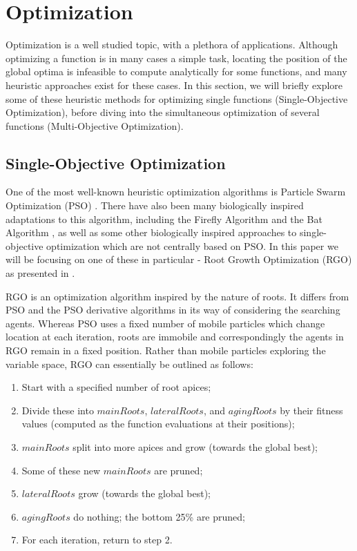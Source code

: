 \documentclass[letterpaper, 10 pt, conference]{ieeeconf}  %
\begin{document}
\section{Optimization}

Optimization is a well studied topic, with a plethora of applications.  Although optimizing a function is in many cases a simple task, locating the position of the global optima is infeasible to compute analytically for some functions, and many heuristic approaches exist for these cases.  In this section, we will briefly explore some of these heuristic methods for optimizing single functions (Single-Objective Optimization), before diving into the simultaneous optimization of several functions (Multi-Objective Optimization).

\subsection{Single-Objective Optimization}
One of the most well-known heuristic optimization algorithms is Particle Swarm Optimization (PSO) \cite{PSOPaper}.  There have also been many biologically inspired adaptations to this algorithm, including the Firefly Algorithm \cite{FireflyPaper} and the Bat Algorithm \cite{BatsPaper}, as well as some other biologically inspired approaches to single-objective optimization which are not centrally based on PSO.  In this paper we will be focusing on one of these in particular - Root Growth Optimization (RGO) as presented in \cite{RGOPaper}.

RGO is an optimization algorithm inspired by the nature of roots.  It differs from PSO and the PSO derivative algorithms in its way of considering the searching agents. Whereas PSO uses a fixed number of mobile particles which change location at each iteration, roots are immobile and correspondingly the agents in RGO remain in a fixed position.  Rather than mobile particles exploring the variable space, RGO can essentially be outlined as follows:
\begin{enumerate}
\item Start with a specified number of root apices;
\item Divide these into $mainRoots$, $lateralRoots$, and $agingRoots$ by their fitness values (computed as the function evaluations at their positions);
\item $mainRoots$ split into more apices and grow (towards the global best);
\item Some of these new $mainRoots$ are pruned;
\item $lateralRoots$ grow (towards the global best);
\item $agingRoots$ do nothing; the bottom 25\% are pruned;
\item For each iteration, return to step 2. 
\end{enumerate}  
\end{document}
